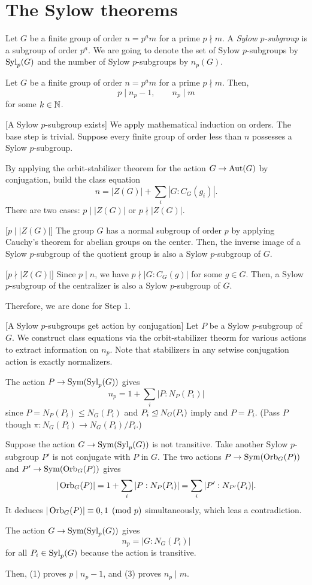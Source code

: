 \documentclass{../note}
\begin{document}
\chapter{The Sylow theorems}
\begin{defn}
Let $G$ be a finite group of order $n=p^am$ for a prime $p\nmid m$.
A \emph{Sylow $p$-subgroup} is a subgroup of order $p^a$.
We are going to denote the set of Sylow $p$-subgroups by $\operatorname{Syl}_p(G)$ and the number of Sylow $p$-subgroups by $n_p(G)$.
\end{defn}

\begin{thm}[Sylow]
Let $G$ be a finite group of order $n=p^am$ for a prime $p\nmid m$.
Then,
\[p\mid n_p-1,\qquad n_p\mid m\]
for some $k\in\mathbb{N}$.
\end{thm}
\begin{pf}
[A Sylow $p$-subgroup exists]
We apply mathematical induction on orders.
The base step is trivial.
Suppose every finite group of order less than $n$ possesses a Sylow $p$-subgroup.

By applying the orbit-stabilizer theorem for the action $G\to\operatorname{Aut}(G)$ by conjugation, build the class equation
\[n=|Z(G)|+\sum_i|G:C_G(g_i)|.\]
There are two cases: $p\mid|Z(G)|$ or $p\nmid|Z(G)|$.

[$p\mid|Z(G)|$]
The group $G$ has a normal subgroup of order $p$ by applying Cauchy's theorem for abelian groups on the center.
Then, the inverse image of a Sylow $p$-subgroup of the quotient group is also a Sylow $p$-subgroup of $G$.

[$p\nmid|Z(G)|$]
Since $p\mid n$, we have $p\nmid|G:C_G(g)|$ for some $g\in G$.
Then, a Sylow $p$-subgroup of the centralizer is also a Sylow $p$-subgroup of $G$.

Therefore, we are done for Step 1.

\bigskip
{}[A Sylow $p$-subgroups get action by conjugation]
Let $P$ be a Sylow $p$-subgroup of $G$.
We construct class equations via the orbit-stabilizer theorm for various actions to extract information on $n_p$.
Note that stabilizers in any setwise conjugation action is exactly normalizers.
\begin{parts}
\item The action $P\to\operatorname{Sym}(\operatorname{Syl}_p(G))$ gives
\[n_p=1+\sum_i|P:N_P(P_i)|\]
since $P=N_P(P_i)\le N_G(P_i)$ and $P_i\trianglelefteq N_G(P_i)$ imply and $P=P_i$.
(Pass $P$ though $\pi:N_G(P_i)\to N_G(P_i)/P_i$.)
\item Suppose the action $G\to\operatorname{Sym}(\operatorname{Syl}_p(G))$ is not transitive.
Take another Sylow $p$-subgroup $P'$ is not conjugate with $P$ in $G$.
The two actions $P\to\operatorname{Sym}(\operatorname{Orb}_G(P))$ and $P'\to\operatorname{Sym}(\operatorname{Orb}_G(P))$ gives
\[|\operatorname{Orb}_G(P)|=1+\sum_i|P:N_P(P_i)|=\sum_i|P':N_{P'}(P_i)|.\]
It deduces $|\operatorname{Orb}_G(P)|\equiv0,1\pmod{p}$ simultaneously, which leas a contradiction.
\item The action $G\to\operatorname{Sym}(\operatorname{Syl}_p(G))$ gives
\[n_p=|G:N_G(P_i)|\]
for all $P_i\in\operatorname{Syl}_p(G)$ because the action is transitive.
\end{parts}
Then, (1) proves $p\mid n_p-1$, and (3) proves $n_p\mid m$.
\end{pf}
\end{document}
